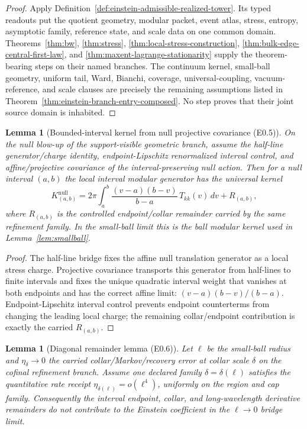 \documentclass[11pt]{article}
\newtheorem{lemma}[theorem]{Lemma}
\begin{document}
\begin{proof}
Apply Definition~\ref{def:einstein-admissible-realized-tower}. Its typed
readouts put the quotient geometry, modular packet, event atlas, stress,
entropy, asymptotic family, reference state, and scale data on one common
domain. Theorems~\ref{thm:bw}, \ref{thm:stress},
\ref{thm:local-stress-construction},
\ref{thm:bulk-edge-central-first-law}, and
\ref{thm:maxent-lagrange-stationarity} supply the theorem-bearing steps on
their named branches. The continuum kernel, small-ball geometry, uniform
tail, Ward, Bianchi, coverage, universal-coupling, vacuum-reference, and scale
clauses are precisely the remaining assumptions listed in
Theorem~\ref{thm:einstein-branch-entry-composed}. No step proves that their
joint source domain is inhabited.
\end{proof}

\begin{lemma}[Bounded-interval kernel from null projective covariance (E0.5)]\label{lem:bounded-interval-kernel}
On the null blow-up of the support-visible geometric branch, assume the
half-line generator/charge identity, endpoint-Lipschitz renormalized interval
control, and affine/projective covariance of the interval-preserving null
action.  Then for a null interval \((a,b)\) the local interval modular
generator has the universal kernel
\[
K_{(a,b)}^{\mathrm{null}}
=2\pi\int_a^b \frac{(v-a)(b-v)}{b-a}\,T_{kk}(v)\,dv
+R_{(a,b)},
\]
where \(R_{(a,b)}\) is the controlled endpoint/collar remainder carried by the
same refinement family.  In the small-ball limit this is the ball modular
kernel used in Lemma~\ref{lem:smallball}.
\end{lemma}

\begin{proof}
The half-line bridge fixes the affine null translation generator as a local
stress charge.  Projective covariance transports this generator from
half-lines to finite intervals and fixes the unique quadratic interval weight
that vanishes at both endpoints and has the correct affine limit:
\((v-a)(b-v)/(b-a)\).  Endpoint-Lipschitz interval control prevents endpoint
counterterms from changing the leading local charge; the remaining
collar/endpoint contribution is exactly the carried \(R_{(a,b)}\).
\end{proof}

\begin{lemma}[Diagonal remainder lemma (E0.6)]\label{lem:diagonal-remainder}
Let \(\ell\) be the small-ball radius and \(\eta_\delta\to0\) the carried
collar/Markov/recovery error at collar scale \(\delta\) on the cofinal
refinement branch. Assume one declared family
\(\delta=\delta(\ell)\) satisfies the quantitative rate receipt
\(\eta_{\delta(\ell)}=o(\ell^4)\), uniformly on the region and cap family.
Consequently the interval endpoint,
collar, and long-wavelength derivative remainders do not contribute to the
Einstein coefficient in the \(\ell\to0\) bridge limit.
\end{lemma}
\end{document}
